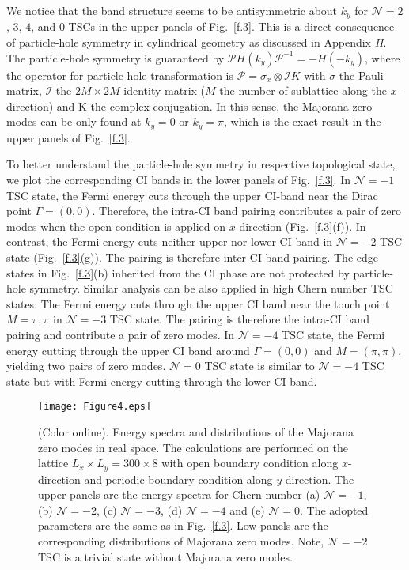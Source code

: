 \documentclass[12pt]{iopart}
\begin{document}
We notice that the band structure seems to be antisymmetric about $k_{y}$ for $\mathcal{N}=2$, $3$, $4$, and $0$ TSCs in the upper panels of Fig.~\ref{f.3}. This is a direct consequence of particle-hole symmetry in cylindrical geometry as discussed in Appendix \emph{II}. The particle-hole symmetry is guaranteed by $\mathcal{P}H(k_{y})\mathcal{P}^{-1}=-H(-k_{y})$, where the operator for particle-hole transformation is $\mathcal{P}=\sigma_{x}\otimes\mathcal{I}K$ with $\sigma$ the Pauli matrix, $\mathcal{I}$ the $2M\times 2M$ identity matrix ($M$ the number of sublattice along the $x$-direction) and K the complex conjugation. In this sense, the Majorana zero modes can be only found at $k_{y}=0$ or $k_{y}=\pi$, which is the exact result in the upper panels of Fig.~\ref{f.3}.

To better understand the particle-hole symmetry in respective topological state, we plot the corresponding CI bands in the lower panels of Fig.~\ref{f.3}. In $\mathcal{N}=-1$ TSC state, the Fermi energy cuts through the upper CI-band near the Dirac point $\Gamma=(0,0)$. Therefore, the intra-CI band pairing contributes a pair of zero modes when the open condition is applied on $x$-direction (Fig.~\ref{f.3}(f)). In contrast, the Fermi energy cuts neither upper nor lower CI band in $\mathcal{N}=-2$ TSC state (Fig.~\ref{f.3}(g)). The pairing is therefore inter-CI band pairing. The edge states in Fig.~\ref{f.3}(b) inherited from the CI phase are not protected by particle-hole symmetry. Similar analysis can be also applied in high Chern number TSC states. The Fermi energy cuts through the upper CI band near the touch point $M={\pi,\pi}$ in $\mathcal{N}=-3$ TSC state. The pairing is therefore the intra-CI band pairing and contribute a pair of zero modes. In $\mathcal{N}=-4$ TSC state, the Fermi energy cutting through the upper CI band around $\Gamma=(0,0)$ and $M=(\pi,\pi)$, yielding two pairs of zero modes. $\mathcal{N}=0$ TSC state is similar to $\mathcal{N}=-4$ TSC state but with Fermi energy cutting through the lower CI band.

\begin{figure*}[tbp]{\centering
  \texttt{[image: Figure4.eps]}}
  \caption{(Color online). Energy spectra and distributions of the Majorana zero modes in real space. The calculations are performed on the lattice $L_{x}\times L_{y}=300\times8$ with open boundary condition along $x$-direction and periodic boundary condition along $y$-direction. The upper panels are the energy spectra for Chern number (a) $\mathcal{N}=-1$, (b) $\mathcal{N}=-2$, (c) $\mathcal{N}=-3$, (d) $\mathcal{N}=-4$ and (e) $\mathcal{N}=0$. The adopted parameters are the same as in Fig.~\ref{f.3}. Low panels are the corresponding distributions of Majorana zero modes. Note, $\mathcal{N}=-2$ TSC is a trivial state without Majorana zero modes.}\label{f.4}
\end{figure*}
\end{document}
